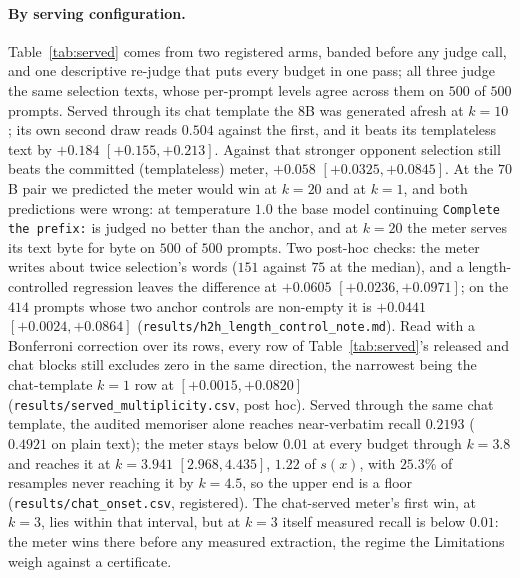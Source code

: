 \paragraph{By serving configuration.}\label{app:served}

Table~\ref{tab:served} comes from two registered arms, banded before any judge call, and one descriptive
re-judge that puts every budget in one pass; all three judge the same selection texts, whose per-prompt
levels agree across them on $500$ of $500$ prompts. Served through its chat template the $8$B was generated
afresh at $k=10$; its own second draw reads $0.504$ against the first, and it beats its templateless text by
$+0.184$ $[+0.155, +0.213]$. Against that stronger opponent selection still beats the committed
(templateless) meter, $+0.058$ $[+0.0325, +0.0845]$. At the $70$B pair we predicted the meter would win at
$k=20$ and at $k=1$, and both predictions were wrong: at temperature $1.0$ the base model continuing
\texttt{Complete the prefix:} is judged no better than the anchor, and at $k=20$ the meter serves its text
byte for byte on $500$ of $500$ prompts. Two post-hoc checks: the meter writes about twice selection's words
($151$ against $75$ at the median), and a length-controlled regression \citep{dubois2024length} leaves the
difference at $+0.0605$ $[+0.0236, +0.0971]$; on the $414$ prompts whose two anchor controls are non-empty it
is $+0.0441$ $[+0.0024, +0.0864]$ (\texttt{results/\allowbreak h2h\_\allowbreak length\_\allowbreak control\_\allowbreak note.md}).
Read with a Bonferroni correction over its rows, every row of Table~\ref{tab:served}'s released and chat
blocks still excludes zero in the same direction, the narrowest being the chat-template $k=1$ row at
$[+0.0015, +0.0820]$ (\texttt{results/\allowbreak served\_\allowbreak multiplicity.csv}, post hoc).
Served through the same chat template, the audited memoriser alone reaches near-verbatim recall $0.2193$
($0.4921$ on plain text); the meter stays below $0.01$ at every budget through $k=3.8$ and reaches it at
$k=3.941$ $[2.968, 4.435]$, $1.22$ of $s(x)$, with $25.3\%$ of resamples never reaching it by $k=4.5$, so the upper
end is a floor (\texttt{results/\allowbreak chat\_\allowbreak onset.csv}, registered). The chat-served
meter's first win, at $k=3$, lies within that interval, but at $k=3$ itself measured recall is below $0.01$: the meter wins there before any measured extraction, the regime the Limitations weigh against a certificate.

